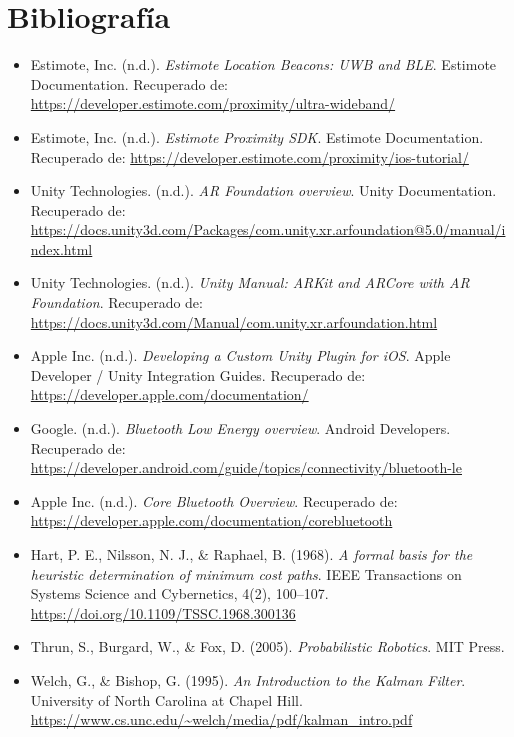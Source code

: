 \documentclass{article}
\begin{document}
\section{Bibliografía}
\begin{itemize} 
    \item Estimote, Inc. (n.d.). \textit{Estimote Location Beacons: UWB and BLE}. Estimote Documentation. Recuperado de: \url{https://developer.estimote.com/proximity/ultra-wideband/}
    
    \item Estimote, Inc. (n.d.). \textit{Estimote Proximity SDK}. Estimote Documentation. Recuperado de: \url{https://developer.estimote.com/proximity/ios-tutorial/}
    
    \item Unity Technologies. (n.d.). \textit{AR Foundation overview}. Unity Documentation. Recuperado de: \url{https://docs.unity3d.com/Packages/com.unity.xr.arfoundation@5.0/manual/index.html}
    
    \item Unity Technologies. (n.d.). \textit{Unity Manual: ARKit and ARCore with AR Foundation}. Recuperado de: \url{https://docs.unity3d.com/Manual/com.unity.xr.arfoundation.html}

    \item Apple Inc. (n.d.). \textit{Developing a Custom Unity Plugin for iOS}. Apple Developer / Unity Integration Guides. Recuperado de: \url{https://developer.apple.com/documentation/}
    
    \item Google. (n.d.). \textit{Bluetooth Low Energy overview}. Android Developers. Recuperado de: \url{https://developer.android.com/guide/topics/connectivity/bluetooth-le}
    
    \item Apple Inc. (n.d.). \textit{Core Bluetooth Overview}. Recuperado de: \url{https://developer.apple.com/documentation/corebluetooth}
    
    \item Hart, P. E., Nilsson, N. J., \& Raphael, B. (1968). \textit{A formal basis for the heuristic determination of minimum cost paths}. IEEE Transactions on Systems Science and Cybernetics, 4(2), 100–107. \url{https://doi.org/10.1109/TSSC.1968.300136}
    
    \item Thrun, S., Burgard, W., \& Fox, D. (2005). \textit{Probabilistic Robotics}. MIT Press.
    
    \item Welch, G., \& Bishop, G. (1995). \textit{An Introduction to the Kalman Filter}. University of North Carolina at Chapel Hill. \url{https://www.cs.unc.edu/~welch/media/pdf/kalman_intro.pdf}
    

\end{itemize}
\end{document}
